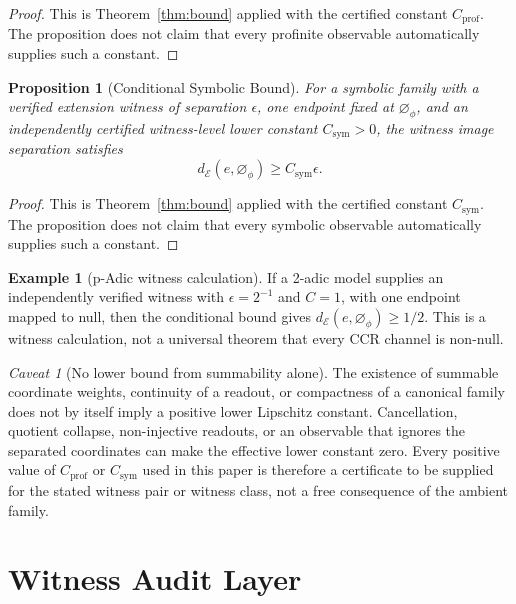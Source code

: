 \documentclass[11pt,a4paper]{article}
\theoremstyle{plain}
\newtheorem{proposition}[theorem]{Proposition}
\theoremstyle{definition}
\newtheorem{example}[theorem]{Example}
\theoremstyle{remark}
\newtheorem{caveat}[theorem]{Caveat}
\newcommand{\dE}{d_{\mathcal{E}}}
\newcommand{\nullphi}{\varnothing_\phi}
\begin{document}
\begin{proof}
This is Theorem~\ref{thm:bound} applied with the certified constant $C_{\mathrm{prof}}$. The proposition does not claim that every profinite observable automatically supplies such a constant.
\end{proof}

\begin{proposition}[Conditional Symbolic Bound]
For a symbolic family with a verified extension witness of separation $\epsilon$, one endpoint fixed at $\nullphi$, and an independently certified witness-level lower constant $C_{\mathrm{sym}}>0$, the witness image separation satisfies
\[
\dE(e,\nullphi)\geq C_{\mathrm{sym}}\epsilon.
\]
\end{proposition}

\begin{proof}
This is Theorem~\ref{thm:bound} applied with the certified constant $C_{\mathrm{sym}}$. The proposition does not claim that every symbolic observable automatically supplies such a constant.
\end{proof}

\begin{example}[p-Adic witness calculation]
If a 2-adic model supplies an independently verified witness with $\epsilon=2^{-1}$ and $C=1$, with one endpoint mapped to null, then the conditional bound gives $\dE(e,\nullphi)\geq 1/2$. This is a witness calculation, not a universal theorem that every CCR channel is non-null.
\end{example}

\begin{caveat}[No lower bound from summability alone]
The existence of summable coordinate weights, continuity of a readout, or compactness of a canonical family does not by itself imply a positive lower Lipschitz constant. Cancellation, quotient collapse, non-injective readouts, or an observable that ignores the separated coordinates can make the effective lower constant zero. Every positive value of $C_{\mathrm{prof}}$ or $C_{\mathrm{sym}}$ used in this paper is therefore a certificate to be supplied for the stated witness pair or witness class, not a free consequence of the ambient family.
\end{caveat}

\section{Witness Audit Layer}
\end{document}
